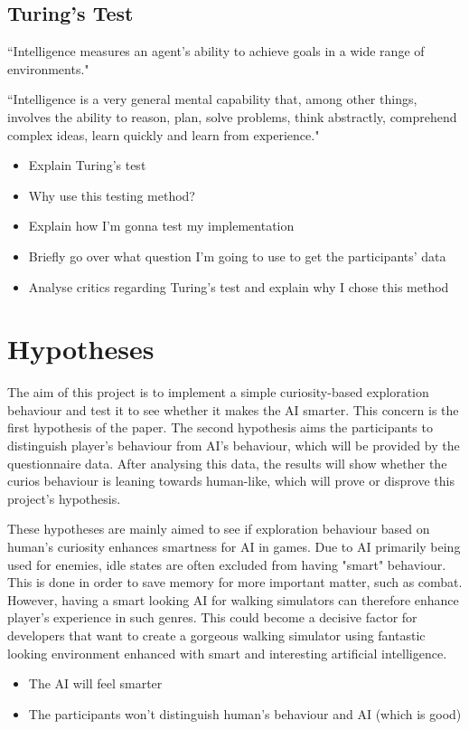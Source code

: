 \documentclass[journal]{IEEEtran}
\begin{document}
\subsection{Turing's Test}
``Intelligence measures an agent’s ability to achieve goals in a wide range of
environments." \cite{legg2007universal}

``Intelligence is a very general mental capability that, among other things, involves
the ability to reason, plan, solve problems, think abstractly, comprehend complex
ideas, learn quickly and learn from experience." \cite{gottfredson1997mainstream}
\begin{itemize}
	\item Explain Turing's test
	\item Why use this testing method?
	\item Explain how I'm gonna test my implementation
	\item Briefly go over what question I'm going to use to get the participants' data
	\item Analyse critics regarding Turing's test and explain why I chose this method
\end{itemize}

\section{Hypotheses}
The aim of this project is to implement a simple curiosity-based exploration behaviour and test it to see whether it makes the AI smarter. This concern is the first hypothesis of the paper. The second hypothesis aims the participants to distinguish player's behaviour from AI's behaviour, which will be provided by the questionnaire data. After analysing this data, the results will show whether the curios behaviour is leaning towards human-like, which will prove or disprove this project's hypothesis.

These hypotheses are mainly aimed to see if exploration behaviour based on human's curiosity enhances smartness for AI in games. Due to AI primarily being used for enemies, idle states are often excluded from having "smart" behaviour. This is done in order to save memory for more important matter, such as combat. However, having a smart looking AI for walking simulators can therefore enhance player's experience in such genres. This could become a decisive factor for developers that want to create a gorgeous walking simulator using fantastic looking environment enhanced with smart and interesting artificial intelligence.
\begin{itemize}
	\item The AI will feel smarter
	\item The participants won't distinguish human's behaviour and AI (which is good)
\end{itemize}
\end{document}
